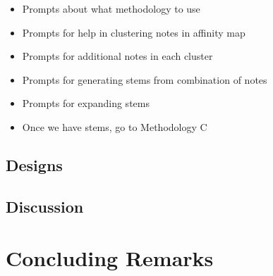 \begin{itemize}
\item Prompts about what methodology to use
\item Prompts for help in clustering notes in affinity map
\item Prompts for additional notes in each cluster
\item Prompts for generating stems from combination of notes
\item Prompts for expanding stems
\item Once we have stems, go to Methodology C
\end{itemize}

\subsection{Designs}


\subsection{Discussion}



\section{Concluding Remarks}





